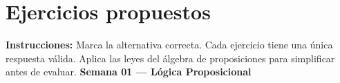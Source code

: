 
\newpage
\section{Ejercicios propuestos}

\begin{tcolorbox}[
  enhanced, colback=GrisClaro, colframe=AzulPizarra,
  arc=2pt, boxrule=0.7pt, left=8pt, right=8pt, top=4pt, bottom=4pt
]
\small\sffamily
\textbf{Instrucciones:} Marca la alternativa correcta. Cada ejercicio
tiene una única respuesta válida. Aplica las leyes del álgebra de
proposiciones para simplificar antes de evaluar.
\hfill \textbf{Semana 01 --- L\'{o}gica Proposicional}
\end{tcolorbox}
\vspace{0.4cm}

\begin{tcolorbox}[
  enhanced, colback=VerdeSuave!40, colframe=VerdeOliva,
  arc=2pt, boxrule=0.5pt, fonttitle=\sffamily\bfseries\small,
  title={Nivel B\'{a}sico}, left=4pt, right=4pt, top=3pt, bottom=3pt
]\end{tcolorbox}


